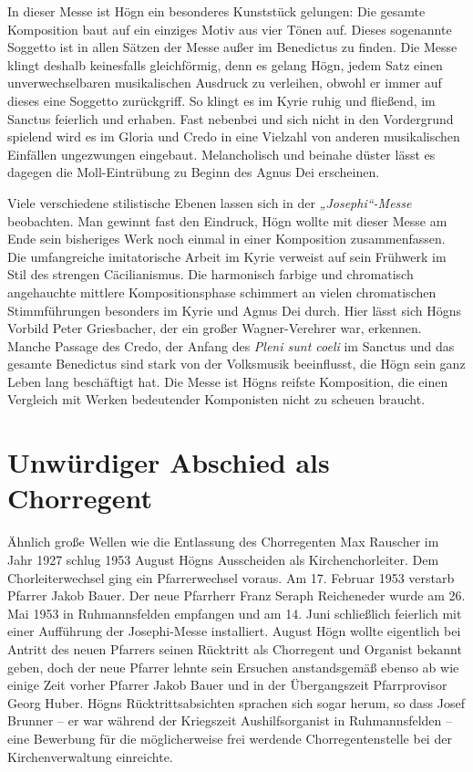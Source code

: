 \documentclass{book}
\begin{document}
In dieser Messe ist Högn ein besonderes Kunststück gelungen: Die
ge\-samte Komposition baut auf ein einziges Motiv aus vier Tönen auf.
Dieses sogenannte Soggetto ist in allen Sätzen der Messe außer im
Benedictus zu finden. Die Messe klingt deshalb keinesfalls
gleichförmig, denn es gelang Högn, jedem Satz einen unverwechselbaren
musikalischen Ausdruck zu ver\-leihen, obwohl er immer auf dieses eine
Soggetto zurückgriff. So klingt es im Kyrie ruhig und fließend, im
Sanctus feierlich und erhaben. Fast nebenbei und sich nicht in den
Vordergrund spielend wird es im Gloria und Credo in eine Vielzahl von
anderen musikalischen Einfällen ungezwungen eingebaut. Melan\-cholisch
und beinahe düster lässt es dagegen die Moll-Eintrübung zu Beginn des
Agnus Dei erscheinen.

Viele verschiedene stilistische Ebenen lassen sich in der
\textit{„Josephi“-Messe} beobachten. Man gewinnt fast den Eindruck,
Högn wollte mit dieser Messe am Ende sein bisheriges Werk noch einmal
in einer Komposition zusammen\-fassen. Die umfangreiche imitatorische
Arbeit im Kyrie verweist auf sein Frühwerk im Stil des strengen
Cäcilianismus. Die harmonisch farbige und chromatisch angehauchte
mittlere Kompositionsphase schimmert an vielen chromatischen
Stimmführungen besonders im Kyrie und Agnus Dei durch. Hier lässt sich
Högns Vorbild Peter Griesbacher, der ein großer Wagner-Ver\-ehrer war,
erkennen. Manche Passage des Credo, der Anfang des \textit{Pleni sunt
coeli} im Sanctus und das gesamte Benedictus sind stark von der
Volksmusik be\-einflusst, die Högn sein ganz Leben lang beschäftigt
hat. Die Messe ist Högns reifste Komposition, die einen Vergleich mit
Werken bedeutender Kompo\-nisten nicht zu scheuen braucht.

\section{Unwürdiger Abschied als Chorregent}

Ähnlich große Wellen wie die Entlassung des Chorregenten Max Rauscher im
Jahr 1927 schlug 1953 August Högns Ausscheiden als Kirchenchorleiter.
Dem Chorleiterwechsel ging ein Pfarrerwechsel voraus. Am 17. Februar
1953 ver\-starb Pfarrer Jakob Bauer. Der neue Pfarrherr Franz Seraph
Reicheneder wur\-de am 26. Mai 1953 in Ruhmannsfelden empfangen und am
14. Juni schließ\-lich feierlich mit einer Aufführung der Josephi-Messe
installiert. August Högn wollte eigentlich bei Antritt des neuen
Pfarrers seinen Rücktritt als Chorregent und Organist bekannt geben,
doch der neue Pfarrer lehnte sein Ersuchen anstandsgemäß ebenso ab wie
einige Zeit vorher Pfarrer Jakob Bauer und in der Übergangszeit
Pfarrprovisor Georg Huber. Högns Rücktrittsabsichten sprachen sich
sogar herum, so dass Josef Brunner – er war während der Kriegszeit
Aushilfsorganist in Ruhmannsfelden – eine Bewerbung für die
möglicherweise frei werdende Chorregentenstelle bei der
Kirchenverwaltung einreichte.
\end{document}

